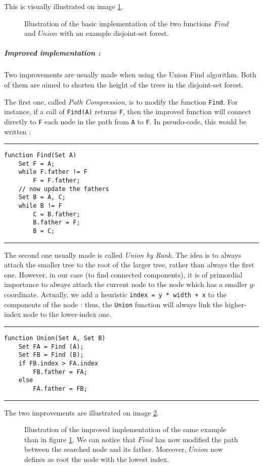 \documentclass{article}
\newcommand{\imageWithoutFigure}[2] { \fbox {\imageWithoutFigureAndBox{#1}{#2} } }
\newcommand{\imageWithoutFigureAndBox}[2] { \texttt{[image: images/\#1]} }
\newcommand{\Figure}[3] { \begin{figure}[!ht] \centering{#1} \caption{#2 \label{#3} } \end{figure} }
\newcommand{\image}[4] { \Figure{\imageWithoutFigure{#1}{#2}} {#3} {#4} }
\begin{document}
This is visually illustrated on image \ref{img_union-find_simple}.

\image{disjointSets/union-find_simple.png} {8} {Illustration of the basic implementation of the two functions $Find$ and $Union$ with an example disjoint-set forest.} {img_union-find_simple}


\subparagraph{Improved implementation :}
Two improvements are usually made when using the Union Find algorithm. Both of them are aimed to shorten the height of the trees in the disjoint-set forest.

The first one, called \textit{Path Compression}, is to modify the function \verb|Find|.
For instance, if a call of \verb|Find(A)| returns \verb|F|, then the improved function will connect directly to \verb|F| each node in the path from \verb|A| to \verb|F|.
In pseudo-code, this would be written :

\hrule
\begin{verbatim}
function Find(Set A)
    Set F = A;
    while F.father != F
        F = F.father;
    // now update the fathers
    Set B = A, C;
    while B != F
        C = B.father;
        B.father = F;
        B = C;
\end{verbatim}
\hrule\vspace*{.5 cm}

The second one usually made is called \textit{Union by Rank}.
The idea is to always attach the smaller tree to the root of the larger tree, rather than always the first one.
However, in our case (to find connected components), it is of primordial importance to always attach the current node to the node which has a smaller $y$-coordinate.
Actually, we add a heuristic \verb|index = y * width + x| to the components of the node : thus, the \verb|Union| function will always link the higher-index node to the lower-index one.

\hrule
\begin{verbatim}
function Union(Set A, Set B)
    Set FA = Find (A);
    Set FB = Find (B);
    if FB.index > FA.index
        FB.father = FA;
    else
        FA.father = FB;
\end{verbatim}
\hrule\vspace*{.5 cm}


The two improvements are illustrated on image \ref{img_union-find_complex}.
\image{disjointSets/union-find_complex.png} {9} {
    Illustration of the improved implementation of the same example than in figure \ref{img_union-find_simple}.
    We can notice that $Find$ has now modified the path between the searched node and its father.
    Moreover, $Union$ now defines as root the node with the lowest index.
} {img_union-find_complex}
\end{document}
